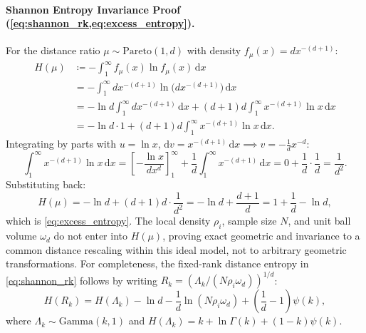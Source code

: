 \paragraph{Shannon Entropy Invariance Proof
(\cref{eq:shannon_rk,eq:excess_entropy}).}
For the distance ratio $\mu \sim \mathrm{Pareto}(1, d)$ with density
$f_\mu(x) = d x^{-(d+1)}$:
\begin{equation}
  \begin{aligned}
    H(\mu) &\coloneqq -\int_1^\infty f_\mu(x) \ln f_\mu(x)\,\mathrm{d}x \\
    &= -\int_1^\infty d x^{-(d+1)} \ln\bigl(d x^{-(d+1)}\bigr)\,\mathrm{d}x \\
    &= -\ln d \int_1^\infty d x^{-(d+1)}\,\mathrm{d}x + (d + 1) d
    \int_1^\infty x^{-(d+1)}\ln x\,\mathrm{d}x \\
    &= -\ln d \cdot 1 + (d + 1) d \int_1^\infty x^{-(d+1)}\ln x\,\mathrm{d}x.
  \end{aligned}
\end{equation}
Integrating by parts with $u = \ln x$, $\mathrm{d}v =
x^{-(d+1)}\,\mathrm{d}x \implies v = -\frac{1}{d}x^{-d}$:
\begin{equation}
  \int_1^\infty x^{-(d+1)}\ln x\,\mathrm{d}x = \left[ -\frac{\ln
  x}{d x^d} \right]_1^\infty + \frac{1}{d}\int_1^\infty x^{-(d+1)}\,\mathrm{d}x
  = 0 + \frac{1}{d} \cdot \frac{1}{d} = \frac{1}{d^2}.
\end{equation}
Substituting back:
\begin{equation}
  H(\mu) = -\ln d + (d + 1) d \cdot \frac{1}{d^2} = -\ln d + \frac{d
  + 1}{d} = 1 + \frac{1}{d} - \ln d,
\end{equation}
which is \cref{eq:excess_entropy}. The local density $\rho_i$,
sample size $N$, and unit ball volume
$\omega_d$ do not enter into $H(\mu)$, proving exact geometric and
invariance to a common distance rescaling within this ideal model, not
to arbitrary geometric transformations. For completeness, the
fixed-rank distance entropy in \cref{eq:shannon_rk} follows by writing
$R_k=(\Lambda_k/(N\rho_i\omega_d))^{1/d}$:
\begin{equation}
  H(R_k)=H(\Lambda_k)-\ln d-\frac{1}{d}\ln(N\rho_i\omega_d)
  +\left(\frac{1}{d}-1\right)\psi(k),
\end{equation}
where $\Lambda_k\sim\mathrm{Gamma}(k,1)$ and
$H(\Lambda_k)=k+\ln\Gamma(k)+(1-k)\psi(k)$.

